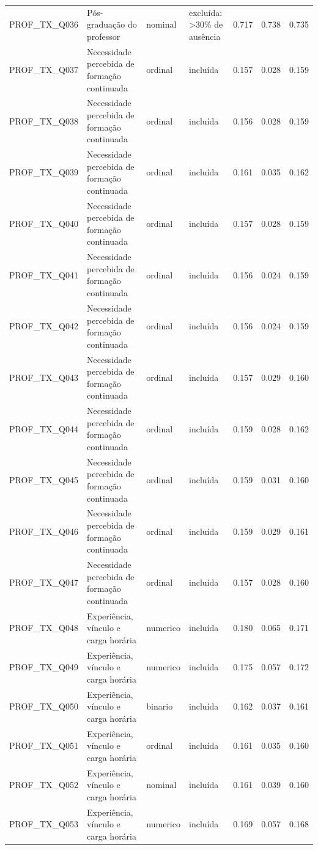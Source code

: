 \begin{tabular}{llllrrr}
PROF\_TX\_Q036 & Pós-graduação do professor & nominal & excluída: >30\% de ausência & 0.717 & 0.738 & 0.735 \\
PROF\_TX\_Q037 & Necessidade percebida de formação continuada & ordinal & incluída & 0.157 & 0.028 & 0.159 \\
PROF\_TX\_Q038 & Necessidade percebida de formação continuada & ordinal & incluída & 0.156 & 0.028 & 0.159 \\
PROF\_TX\_Q039 & Necessidade percebida de formação continuada & ordinal & incluída & 0.161 & 0.035 & 0.162 \\
PROF\_TX\_Q040 & Necessidade percebida de formação continuada & ordinal & incluída & 0.157 & 0.028 & 0.159 \\
PROF\_TX\_Q041 & Necessidade percebida de formação continuada & ordinal & incluída & 0.156 & 0.024 & 0.159 \\
PROF\_TX\_Q042 & Necessidade percebida de formação continuada & ordinal & incluída & 0.156 & 0.024 & 0.159 \\
PROF\_TX\_Q043 & Necessidade percebida de formação continuada & ordinal & incluída & 0.157 & 0.029 & 0.160 \\
PROF\_TX\_Q044 & Necessidade percebida de formação continuada & ordinal & incluída & 0.159 & 0.028 & 0.162 \\
PROF\_TX\_Q045 & Necessidade percebida de formação continuada & ordinal & incluída & 0.159 & 0.031 & 0.160 \\
PROF\_TX\_Q046 & Necessidade percebida de formação continuada & ordinal & incluída & 0.159 & 0.029 & 0.161 \\
PROF\_TX\_Q047 & Necessidade percebida de formação continuada & ordinal & incluída & 0.157 & 0.028 & 0.160 \\
PROF\_TX\_Q048 & Experiência, vínculo e carga horária & numerico & incluída & 0.180 & 0.065 & 0.171 \\
PROF\_TX\_Q049 & Experiência, vínculo e carga horária & numerico & incluída & 0.175 & 0.057 & 0.172 \\
PROF\_TX\_Q050 & Experiência, vínculo e carga horária & binario & incluída & 0.162 & 0.037 & 0.161 \\
PROF\_TX\_Q051 & Experiência, vínculo e carga horária & ordinal & incluída & 0.161 & 0.035 & 0.160 \\
PROF\_TX\_Q052 & Experiência, vínculo e carga horária & nominal & incluída & 0.161 & 0.039 & 0.160 \\
PROF\_TX\_Q053 & Experiência, vínculo e carga horária & numerico & incluída & 0.169 & 0.057 & 0.168 \\

\end{tabular}
